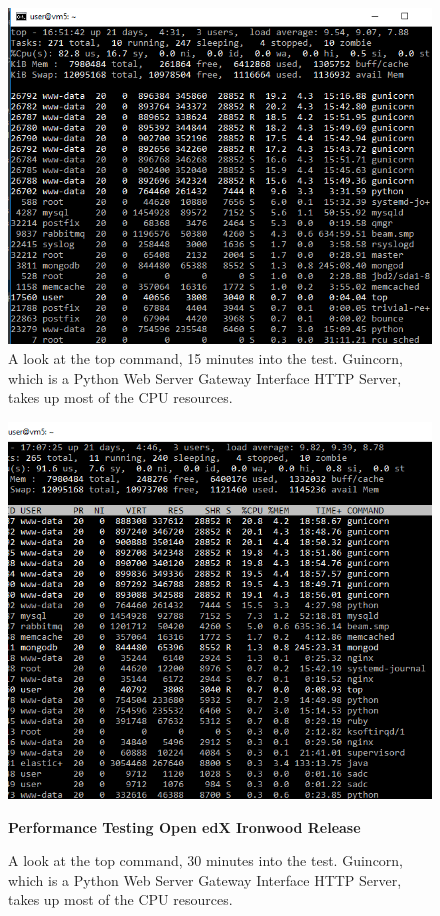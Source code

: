 \documentclass[12pt]{report}
\begin{document}
\newpage
\begin{figure}[h!]
	\centering
	\includegraphics[width=\textwidth,height=\textheight,keepaspectratio]{intro/S1.png}
	\caption{A look at the top command, 15 minutes into the test. Guincorn, which is a Python Web Server Gateway Interface HTTP Server, takes up most of the CPU resources.}
\end{figure}
\begin{figure}[h!]
	\centering
	\includegraphics[width=\textwidth,height=\textheight,keepaspectratio]{intro/S2.png}\begin{center}
		\textbf{\Large{Performance Testing Open edX Ironwood Release}}
	\end{center}
	\caption{A look at the top command, 30 minutes into the test. Guincorn, which is a Python Web Server Gateway Interface HTTP Server, takes up most of the CPU resources. }
\end{figure}
\end{document}
